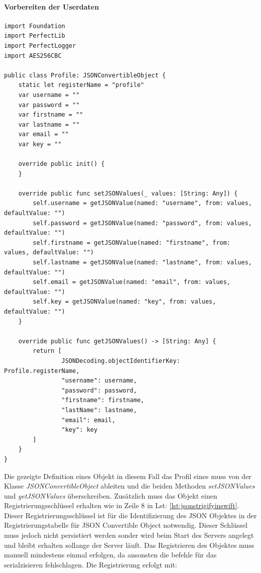 \paragraph{Vorbereiten der Userdaten}

\begin{lstlisting}
import Foundation
import PerfectLib
import PerfectLogger
import AES256CBC

public class Profile: JSONConvertibleObject {
    static let registerName = "profile"
    var username = ""
    var password = ""
    var firstname = ""
    var lastname = ""
    var email = ""
    var key = ""

    override public init() {
    }

    override public func setJSONValues(_ values: [String: Any]) {
        self.username = getJSONValue(named: "username", from: values, defaultValue: "")
        self.password = getJSONValue(named: "password", from: values, defaultValue: "")
        self.firstname = getJSONValue(named: "firstname", from: values, defaultValue: "")
        self.lastname = getJSONValue(named: "lastname", from: values, defaultValue: "")
        self.email = getJSONValue(named: "email", from: values, defaultValue: "")
        self.key = getJSONValue(named: "key", from: values, defaultValue: "")
    }

    override public func getJSONValues() -> [String: Any] {
        return [
                JSONDecoding.objectIdentifierKey: Profile.registerName,
                "username": username,
                "password": password,
                "firstname": firstname,
                "lastName": lastname,
                "email": email,
                "key": key
        ]
    }
}
\end{lstlisting}

Die gezeigte Definition eines Objekt in diesem Fall das Profil eines muss von der Klasse \textit{JSONConvertibleObject} ableiten und die beiden Methoden \textit{setJSONValues} und \textit{getJSONValues} überschreiben. Zusätzlich muss das Objekt einen Registrierungsschlüssel erhalten wie in Zeile 8 in Lst:  \ref{lst:jsonstrigifyinswift}. Dieser Registrierungsschlüssel ist für die Identifizierung des JSON Objektes in der Registrierungstabelle für JSON Convertible Object notwendig. Dieser Schlüssel muss jedoch nicht persistiert werden sonder wird beim Start des Servers angelegt und bleibt erhalten sollange der Server läuft. Das Registrieren des Objektes muss manuell mindestens einmal erfolgen, da ansonsten die befehle für das serialzisieren fehlschlagen. Die Registrierung erfolgt mit:

